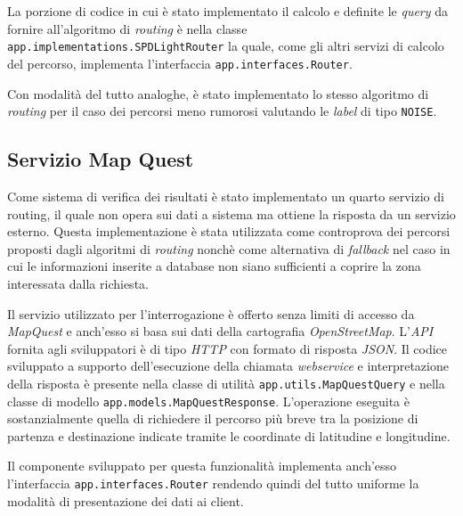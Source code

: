 La porzione di codice in cui è stato implementato il calcolo e definite le \emph{query} da fornire all'algoritmo di \emph{routing} è nella classe \texttt{app.\-implementations.\-SPDLightRouter} la quale, come gli altri servizi di calcolo del percorso, implementa l'interfaccia \texttt{app.\-interfaces.\-Router}.

Con modalità del tutto analoghe, è stato implementato lo stesso algoritmo di \emph{routing} per il caso dei percorsi meno rumorosi valutando le \emph{label} di tipo \texttt{NOISE}.

\subsection{Servizio Map Quest}
Come sistema di verifica dei risultati è stato implementato un quarto servizio di routing, il quale non opera sui dati a sistema ma ottiene la risposta da un servizio esterno. Questa implementazione è stata utilizzata come controprova dei percorsi proposti dagli algoritmi di \emph{routing} nonchè come alternativa di \emph{fallback} nel caso in cui le informazioni inserite a database non siano sufficienti a coprire la zona interessata dalla richiesta.

Il servizio utilizzato per l'interrogazione è offerto senza limiti di accesso da \emph{MapQuest} e anch'esso si basa sui dati della cartografia \emph{OpenStreetMap}. L'\emph{API} fornita agli sviluppatori è di tipo \emph{HTTP} con formato di risposta \emph{JSON}. Il codice sviluppato a supporto dell'esecuzione della chiamata \emph{webservice} e interpretazione della risposta è presente nella classe di utilità \texttt{app.\-utils.\-MapQuestQuery} e nella classe di modello \texttt{app.\-models.\-MapQuestResponse}. L'operazione eseguita è sostanzialmente quella di richiedere il percorso più breve tra la posizione di partenza e destinazione indicate tramite le coordinate di latitudine e longitudine.

Il componente sviluppato per questa funzionalità implementa anch'esso l'interfaccia \texttt{app.\-interfaces.\-Router} rendendo quindi del tutto uniforme la modalità di presentazione dei dati ai client.
